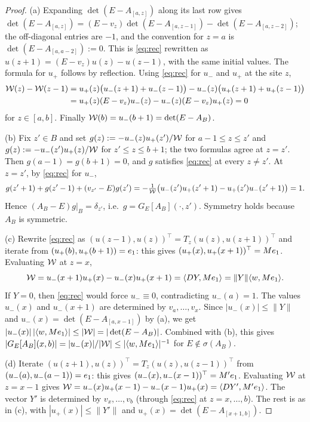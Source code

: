 \begin{proof}
(a) Expanding $\det(E-A_{[a,z]})$ along its last row gives
$\det(E-A_{[a,z]})=(E-v_z)\det(E-A_{[a,z-1]})-\det(E-A_{[a,z-2]})$; the off-diagonal entries are $-1$, and
the convention for $z=a$ is $\det(E-A_{[a,a-2]}):=0$.  This is \eqref{eq:rec} rewritten as
$u(z+1)=(E-v_z)u(z)-u(z-1)$, with the same initial values.  The formula for $u_+$ follows by reflection.
Using \eqref{eq:rec} for $u_-$ and $u_+$ at the site $z$,
\begin{align*}
  \mathcal{W}(z)-\mathcal{W}(z-1)&=u_+(z)\bigl(u_-(z+1)+u_-(z-1)\bigr)-u_-(z)\bigl(u_+(z+1)+u_+(z-1)\bigr)\\
  &=u_+(z)(E-v_z)u_-(z)-u_-(z)(E-v_z)u_+(z)=0
\end{align*}
for $z\in[a,b]$.  Finally $\mathcal{W}(b)=u_-(b+1)=\det(E-A_B)$.

(b) Fix $z'\in B$ and set $g(z):=-u_-(z)u_+(z')/\mathcal{W}$ for $a-1\le z\le z'$ and $g(z):=-u_-(z')u_+(z)/\mathcal{W}$ for
$z'\le z\le b+1$; the two formulas agree at $z=z'$.  Then $g(a-1)=g(b+1)=0$, and $g$ satisfies
\eqref{eq:rec} at every $z\neq z'$.  At $z=z'$, by \eqref{eq:rec} for $u_-$,
\[
  g(z'+1)+g(z'-1)+(v_{z'}-E)g(z')=-\tfrac1{\mathcal{W}}\bigl(u_-(z')u_+(z'+1)-u_+(z')u_-(z'+1)\bigr)=1 .
\]
Hence $(A_B-E)g|_B=\delta_{z'}$, i.e.\ $g=G_E[A_B](\cdot,z')$.  Symmetry holds because $A_B$ is symmetric.

(c) Rewrite \eqref{eq:rec} as $(u(z-1),u(z))^\top=T_z(u(z),u(z+1))^\top$ and iterate from
$(u_+(b),u_+(b+1))=e_1$: this gives $(u_+(x),u_+(x+1))^\top=Me_1$.  Evaluating $\mathcal{W}$ at $z=x$,
\[
  \mathcal{W}=u_-(x+1)u_+(x)-u_-(x)u_+(x+1)=\langle DY,Me_1\rangle=\|Y\|\langle w,Me_1\rangle .
\]
If $Y=0$, then \eqref{eq:rec} would force $u_-\equiv0$, contradicting $u_-(a)=1$.  The values $u_-(x)$ and
$u_-(x+1)$ are determined by $v_a,\dots,v_x$.  Since $|u_-(x)|\le\|Y\|$ and
$u_-(x)=\det(E-A_{[a,x-1]})$ by (a), we get $|u_-(x)|\,|\langle w,Me_1\rangle|\le|\mathcal{W}|=|\det(E-A_B)|$.
Combined with (b), this gives $|G_E[A_B](x,b)|=|u_-(x)|/|\mathcal{W}|\le|\langle w,Me_1\rangle|^{-1}$ for
$E\notin\sigma(A_B)$.

(d) Iterate $(u(z+1),u(z))^\top=T_z(u(z),u(z-1))^\top$ from $(u_-(a),u_-(a-1))=e_1$: this gives
$(u_-(x),u_-(x-1))^\top=M'e_1$.  Evaluating $\mathcal{W}$ at $z=x-1$ gives
$\mathcal{W}=u_-(x)u_+(x-1)-u_-(x-1)u_+(x)=\langle DY',M'e_1\rangle$.  The vector $Y'$ is determined by
$v_x,\dots,v_b$ (through \eqref{eq:rec} at $z=x,\dots,b$).  The rest is as in (c), with
$|u_+(x)|\le\|Y'\|$ and $u_+(x)=\det(E-A_{[x+1,b]})$.
\end{proof}

